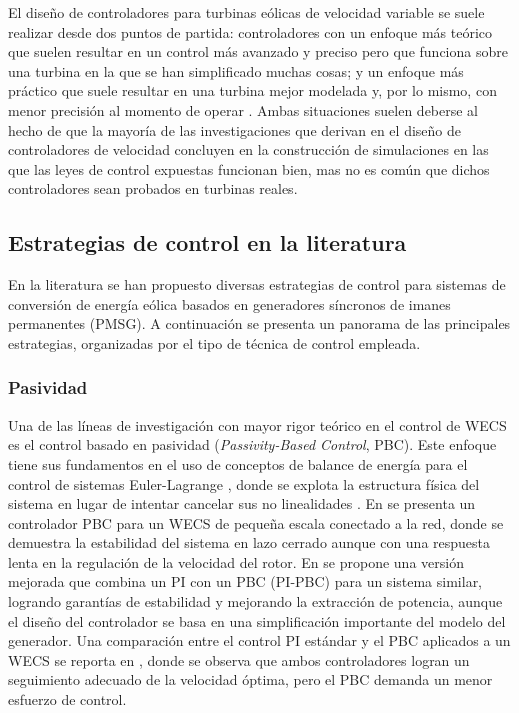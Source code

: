 El diseño de controladores para turbinas eólicas de velocidad variable se suele 
realizar desde dos puntos de partida: controladores con un enfoque más teórico 
que suelen resultar en un control más avanzado y preciso pero que funciona sobre 
una turbina en la que se han simplificado muchas cosas; y un enfoque más práctico 
que suele resultar en una turbina mejor modelada y, por lo mismo, con menor 
precisión al momento de operar \cite{Johnson2004}. Ambas situaciones suelen 
deberse al hecho de que la mayoría de las investigaciones que derivan en el 
diseño de controladores de velocidad concluyen en la construcción de simulaciones 
en las que las leyes de control expuestas funcionan bien, mas no es común que 
dichos controladores sean probados en turbinas reales.
\\

\subsection{Estrategias de control en la literatura}

En la literatura se han propuesto diversas estrategias de control para 
sistemas de conversión de energía eólica basados en generadores síncronos de 
imanes permanentes (PMSG). A continuación se presenta un panorama de las 
principales estrategias, organizadas por el tipo de técnica de control 
empleada.

\subsubsection*{Pasividad}
Una de las líneas de investigación con mayor rigor teórico en el control 
de WECS es el control basado en pasividad (\emph{Passivity-Based Control}, 
PBC). Este enfoque tiene sus fundamentos en el uso de conceptos de balance 
de energía para el control de sistemas Euler-Lagrange \cite{Ortega1998}, 
donde se explota la estructura física del sistema en lugar de intentar 
cancelar sus no linealidades \cite{Ortega2001}. En \cite{Cisneros2013} se 
presenta un controlador PBC para un WECS de pequeña escala conectado a la 
red, donde se demuestra la estabilidad del sistema en lazo cerrado aunque 
con una respuesta lenta en la regulación de la velocidad del rotor. 
En \cite{Cisneros2016} se propone una versión mejorada que combina un PI 
con un PBC (PI-PBC) para un sistema similar, logrando garantías de 
estabilidad y mejorando la extracción de potencia, aunque el diseño del 
controlador se basa en una simplificación importante del modelo del 
generador. Una comparación entre el control PI estándar y el PBC aplicados 
a un WECS se reporta en \cite{Gao2016}, donde se observa que ambos 
controladores logran un seguimiento adecuado de la velocidad óptima, pero 
el PBC demanda un menor esfuerzo de control.
\\

